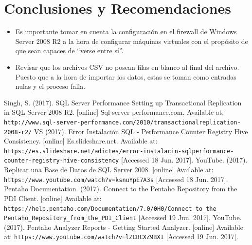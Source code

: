 \documentclass{article}
\begin{document}
\section{Conclusiones y Recomendaciones}
\begin{itemize}
  \item Es importante tomar en cuenta la configuraci\'on en el firewall de Windows Server 2008 R2 a la hora de configurar m\'aquinas virtuales con el prop\'osito de que sean capaces de ``verse entre s\'i''.
  \item Revisar que los archivos CSV no posean filas en blanco al final del archivo. Puesto que a la hora de importar los datos, estas se toman como entradas nulas y el proceso falla.
\end{itemize}

\begin{thebibliography}{99}
  Singh, S. (2017). SQL Server Performance Setting up Transactional Replication in SQL Server 2008 R2. [online] Sql-server-performance.com. Available at: \texttt{http://www.sql-server-performance.com/2010/transactional\-replication-2008-r2/}
 VS (2017). Error Instalaci\'on SQL - Performance Counter Registry Hive Consistency. [online] Es.slideshare.net. Available at: \texttt {https://es.slideshare.net/adictes/error-instalacin-sql\-performance-counter-registry-hive-consistency} [Accessed 18 Jun. 2017].
 YouTube. (2017). Replicar una Base de Datos de SQL Server 2008. [online] Available at: \texttt{https://www.youtube.com/watch?v=ksnuYpE7A3s} [Accessed 18 Jun. 2017].
 Pentaho Documentation. (2017). Connect to the Pentaho Repository from the PDI Client. [online] Available at: \texttt{https://help.pentaho.com/Documentation/7.0/0H0/Connect\_to\_the\_\\Pentaho\_Repository\_from\_the\_PDI\_Client} [Accessed 19 Jun. 2017].
 YouTube. (2017). Pentaho Analyzer Reports - Getting Started Analyzer. [online] Available at: \texttt{https://www.youtube.com/watch?v=lZCBCXZ9BXI} [Accessed 19 Jun. 2017].
\end{thebibliography}
\end{document}
